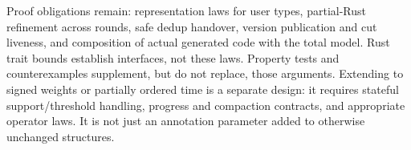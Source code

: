 \label{sec:incremental-scope}
Proof obligations remain: representation laws for user types, partial-Rust
refinement across rounds, safe dedup handover, version publication and cut
liveness, and composition of actual generated code with the total model.
Rust trait bounds establish interfaces, not these laws. Property tests and
counterexamples supplement, but do not replace, those arguments.
Extending to signed weights or partially ordered time is a separate design:
it requires stateful support/threshold handling, progress and compaction
contracts, and appropriate operator laws. It is not just an annotation
parameter added to otherwise unchanged structures.
